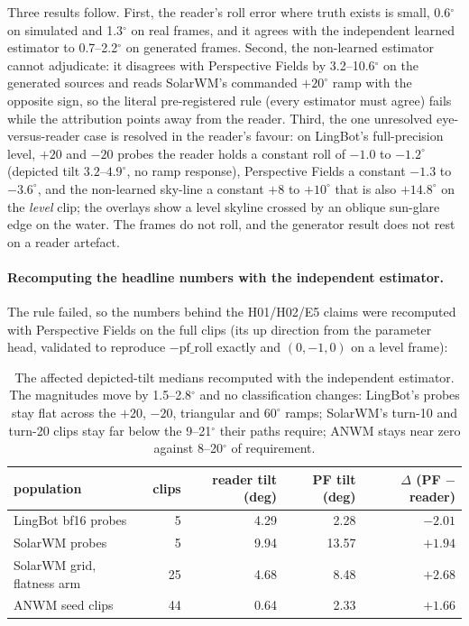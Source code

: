 Three results follow.  First, the reader's roll error where truth exists is small, 0.6$^\circ$
on simulated and 1.3$^\circ$ on real frames, and it agrees with the independent learned
estimator to 0.7--2.2$^\circ$ on generated frames.  Second, the non-learned estimator cannot
adjudicate: it disagrees with Perspective Fields by 3.2--10.6$^\circ$ on the generated sources
and reads SolarWM's commanded $+20^\circ$ ramp with the opposite sign, so the literal
pre-registered rule (every estimator must agree) fails while the attribution points away from
the reader.  Third, the one unresolved eye-versus-reader case is resolved in the reader's
favour: on LingBot's full-precision level, $+20$ and $-20$ probes the reader holds a constant
roll of $-1.0$ to $-1.2^\circ$ (depicted tilt $3.2$--$4.9^\circ$, no ramp response),
Perspective Fields a constant $-1.3$ to $-3.6^\circ$, and the non-learned sky-line a constant
$+8$ to $+10^\circ$ that is also $+14.8^\circ$ on the \emph{level} clip; the overlays show a
level skyline crossed by an oblique sun-glare edge on the water.  The frames do not roll, and
the generator result does not rest on a reader artefact.

\paragraph{Recomputing the headline numbers with the independent estimator.}
The rule failed, so the numbers behind the H01/H02/E5 claims were recomputed with Perspective
Fields on the full clips (its up direction from the parameter head, validated to reproduce
$-\text{pf\_roll}$ exactly and $(0,-1,0)$ on a level frame):

\begin{table}[t]
\footnotesize
\begin{tabular}{lrrrr}
\toprule
population & clips & reader tilt (deg) & PF tilt (deg) & $\Delta$ (PF $-$ reader) \\
\midrule
LingBot bf16 probes & 5 & 4.29 & 2.28 & $-2.01$ \\
SolarWM probes & 5 & 9.94 & 13.57 & $+1.94$ \\
SolarWM grid, flatness arm & 25 & 4.68 & 8.48 & $+2.68$ \\
ANWM seed clips & 44 & 0.64 & 2.33 & $+1.66$ \\
\bottomrule
\end{tabular}
\caption{The affected depicted-tilt medians recomputed with the independent estimator.  The
magnitudes move by 1.5--2.8$^\circ$ and no classification changes: LingBot's probes stay flat
across the $+20$, $-20$, triangular and $60^\circ$ ramps; SolarWM's turn-10 and turn-20 clips
stay far below the 9--21$^\circ$ their paths require; ANWM stays near zero against 8--20$^\circ$
of requirement.}
\label{tab:h03-recompute}
\end{table}

